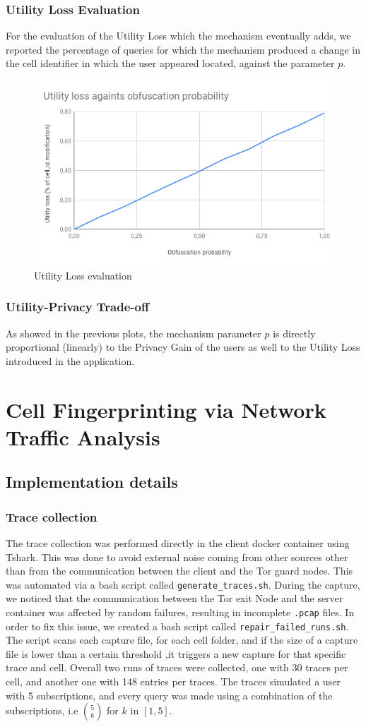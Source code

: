 \documentclass[10pt,conference,compsocconf]{IEEEtran}
\begin{document}
\subsubsection{Utility Loss Evaluation}
For the evaluation of the Utility Loss which the mechanism eventually adds, we
reported the percentage of queries for which the mechanism produced a change in
the cell identifier in which the user appeared located, against the parameter
$p$.
\begin{figure}[h!]
    \centering
    \includegraphics[width=0.6\linewidth]{utility_loss.png}
    \caption{Utility Loss evaluation}
\end{figure}
\subsubsection{Utility-Privacy Trade-off}
As showed in the previous plots, the mechanism parameter $p$ is directly
proportional (linearly) to the Privacy Gain of the users as well to the Utility
Loss introduced in the application.
\section{Cell Fingerprinting via Network Traffic Analysis}

\subsection{Implementation details}

\subsubsection{Trace collection}
The trace collection was performed directly in the client docker container using Tshark.
This was done to avoid external noise coming from other sources other than from the communication between the client and the Tor guard nodes.
This was automated via a bash script called \texttt{generate\_traces.sh}. During the capture, we noticed that the communication between
the Tor exit Node and the server container was affected by random failures, resulting in incomplete \texttt{.pcap} files. In order to fix this issue,
 we created a bash script called \texttt{repair\_failed\_runs.sh}. The script scans each capture file, for each cell folder, and if the size of a capture file
is lower than a certain threshold ,it triggers a new capture for that specific trace and cell. Overall two runs of traces
were collected, one with 30 traces per cell, and another one with 148 entries per traces.
The traces simulated a user with 5 subscriptions, and every query was made using a combination of the subscriptions, i.e $\binom{5}{k}$ for $k$ in $[1,5]$.
\end{document}
